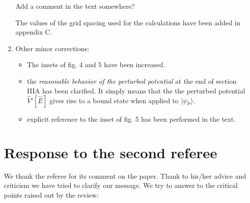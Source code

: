 \documentclass[11pt,a4paper]{article}
\newcommand{\op}[1]{\hat {#1}}
\begin{document}
\begin{enumerate}
 Add a comment in the text somewhere?
 
 The values of the grid spacing used for the calculations have been added in appendix C.
 
\item Other minor corrections:
\begin{itemize}
 \item The insets of fig. 4 and 5 have been increased.
 \item the \emph{reasonable behavior of the perturbed potential} at the end of section IIIA has been clarified. It simply means that the
 the perturbed potential $\op V'[\op E]$ gives rise to a bound state when applied to $\ket{\psi_p}$.
 \item explicit reference to the inset of fig. 5 has been performed in the text.
\end{itemize}

\end{enumerate}

\section*{Response to the second referee}

We thank the referee for its comment on the paper. Thank to his/her advice and criticism we have tried to clarify our message. 
We try to answer to the critical points raised out by the review:
\end{document}
